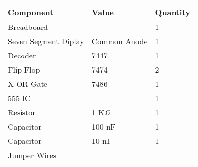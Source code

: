 \begin{tabular}{|l|l|l|}\hline
	Component	&Value &Quantity\\ \hline
	Breadboard & &1 \\ \hline
	Seven Segment Diplay &Common Anode &1 \\ \hline
	Decoder &7447 &1 \\ \hline
	Flip Flop &7474 &2 \\ \hline
	X-OR Gate &7486 &1 \\ \hline
	555 IC & &1 \\ \hline
	Resistor &1 K$\Omega$ &1 \\ \hline
	Capacitor &100 nF &1 \\ \hline
	Capacitor &10 nF &1 \\ \hline
	Jumper Wires & & \\ \hline
\end{tabular}
